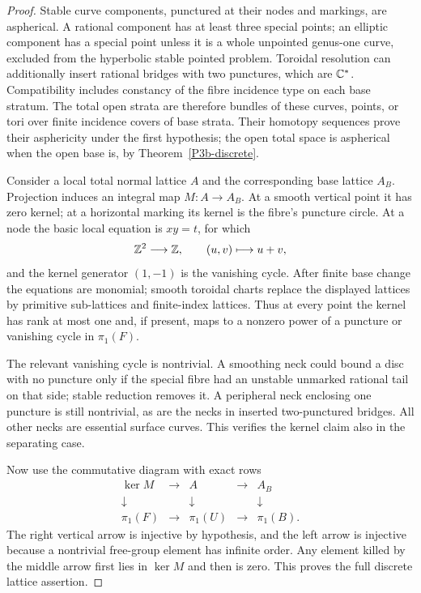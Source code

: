 \begin{proof}
Stable curve components, punctured at their nodes and markings,
are aspherical. A rational component has at least three special
points; an elliptic component has a special point unless it is
a whole unpointed genus-one curve, excluded from the hyperbolic
stable pointed problem. Toroidal resolution can additionally
insert rational bridges with two punctures, which are
$\mathbb C^*$. Compatibility includes constancy of the fibre incidence
type on each base stratum. The total open strata are therefore
bundles of these curves, points, or tori over finite incidence
covers of base strata. Their homotopy sequences prove their
asphericity under the first hypothesis; the open total space is
aspherical when the open base is, by Theorem~\ref{P3b-discrete}.

Consider a local total normal lattice $A$ and the corresponding
base lattice $A_B$. Projection induces an integral map $M:A\to A_B$.
At a smooth vertical point it has zero kernel; at a horizontal
marking its kernel is the fibre's puncture circle. At a node
the basic local equation is $xy=t$, for which
\[
 \mathbb Z^2\longrightarrow\mathbb Z,\qquad (u,v)\longmapsto u+v,
\]
and the kernel generator $(1,-1)$ is the vanishing cycle.
After finite base change the equations are monomial; smooth
toroidal charts replace the displayed lattices by primitive
sub-lattices and finite-index lattices. Thus at every point
the kernel has rank at most one and, if present, maps to a
nonzero power of a puncture or vanishing cycle in $\pi _1(F)$.

The relevant vanishing cycle is nontrivial. A smoothing neck
could bound a disc with no puncture only if the special fibre
had an unstable unmarked rational tail on that side; stable
reduction removes it. A peripheral neck enclosing one puncture
is still nontrivial, as are the necks in inserted two-punctured
bridges. All other necks are essential surface curves.
This verifies the kernel claim also in the separating case.

Now use the commutative diagram with exact rows
\[
\begin{array}{ccccc}
 \ker M&\longrightarrow&A&\longrightarrow&A_B\\
 \downarrow&&\downarrow&&\downarrow\\
 \pi _1(F)&\longrightarrow&\pi _1(U)&\longrightarrow&\pi _1(B).
\end{array}
\]
The right vertical arrow is injective by hypothesis, and the
left arrow is injective because a nontrivial free-group element
has infinite order. Any element killed by the middle arrow
first lies in $\ker M$ and then is zero. This proves the full
discrete lattice assertion.


\end{proof}
